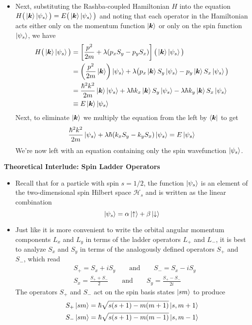 \documentclass[11pt, a4paper]{article}
\newcommand{\eqtext}[1]{\qquad \text{#1} \qquad}
\renewcommand{\vec}[1]{\bm{#1}} %
\renewcommand{\H}{\mathcal{H}}  %
\newcommand{\ua}{\uparrow}  %
\newcommand{\da}{\downarrow}  %
\renewcommand{\k}{\vec{k}}  %
\begin{document}
\begin{itemize}
	\item Next, substituting the Rashba-coupled Hamiltonian $ H $ into the equation $ H\big(\ket{\k} \ket{\psi_{s}}\big) = E \big(\ket{\k} \ket{\psi_{s}}\big) $ and noting that each operator in the Hamiltonian acts either only on the momentum function $ \ket{\k} $ or only on the spin function $ \ket{\psi_{s}} $, we have
	\begin{align*}
		H\big(\ket{\k} \ket{\psi_{s}}\big) &= \left[\frac{p^{2}}{2m} + \lambda (p_{x}S_{y} - p_{y}S_{x})\right]\big(\ket{\k} \ket{\psi_{s}}\big) \\
		& = \left(\frac{p^{2}}{2m}\ket{\k}\right)\ket{\psi_{s}} + \lambda \big(p_{x}\ket{\k} S_{y}\ket{\psi_{s}} - p_{y}\ket{\k} S_{x}\ket{\psi_{s}}\big) \\
		&=\frac{\hbar^{2}k^{2}}{2m}\ket{\k}\ket{\psi_{s}} + \lambda \hbar k_{x}\ket{\k}S_{y}\ket{\psi_{s}} - \lambda \hbar k_{y}\ket{\k}S_{x}\ket{\psi_{s}}\\
		&\equiv E\ket{\k}\ket{\psi_{s}}
	\end{align*}
	Next, to eliminate $ \ket{\k} $ we multiply the equation from the left by $ \bra{\k} $ to get
	\begin{equation*}
		\frac{\hbar^{2}k^{2}}{2m}\ket{\psi_{s}} + \lambda \hbar (k_{x}S_{y} - k_{y}S_{x})\ket{\psi_{s}} = E\ket{\psi_{s}}
	\end{equation*}
	We're now left with an equation containing only the spin wavefunction $ \ket{\psi_{s}} $. 
\end{itemize}

\textbf{Theoretical Interlude: Spin Ladder Operators}
\begin{itemize}

	\item Recall that for a particle with spin $ s = 1/2 $, the function $ \ket{\psi_{s}} $ is an element of the two-dimensional spin Hilbert space $ \H_{s} $ and is written as the linear combination
	\begin{equation*}
		\ket{\psi_{s}} = \alpha \ket{\ua} + \beta \ket{\da}
	\end{equation*}

	\item Just like it is more convenient to write the orbital angular momentum components $ L_{x} $ and $ L_{y} $ in terms of the ladder operators $ L_{+} $ and $ L_{-} $, it is best to analyze $ S_{x} $ and $ S_{y} $ in terms of the analogously defined operators $ S_{+} $ and $ S_{-} $, which read
	\begin{align*}
		& S_{+} = S_{x} + iS_{y} \eqtext{and} S_{-} = S_{x} - i S_{y}\\
		& S_{x} = \frac{S_{+}+S_{-}}{2} \eqtext{and} S_{y} = \frac{S_{+}-S_{-}}{2i}
	\end{align*}
	The operators $ S_{+} $ and $ S_{-} $ act on the spin basis states $ \ket{sm} $ to produce
	\begin{align*}
		& S_{+} \ket{sm} = \hbar \sqrt{s(s+1) - m(m+1)}\ket{s, m+1}\\
		& S_{-} \ket{sm} = \hbar \sqrt{s(s+1) - m(m-1)}\ket{s, m-1}
	\end{align*}
	
\end{itemize}
\end{document}
